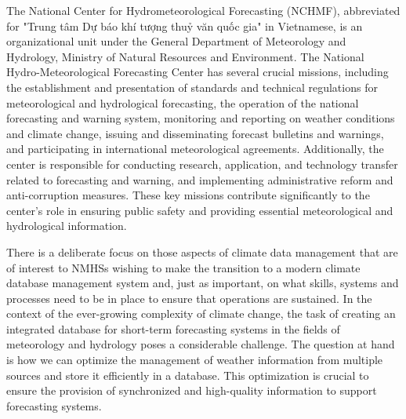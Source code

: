 

The National Center for Hydrometeorological Forecasting (NCHMF), abbreviated for "Trung tâm Dự báo khí tượng thuỷ văn quốc gia" in Vietnamese, is an organizational unit under the General Department of Meteorology and Hydrology, Ministry of Natural Resources and Environment\cite{NMHS}. The National Hydro-Meteorological Forecasting Center has several crucial missions, including the establishment and presentation of standards and technical regulations for meteorological and hydrological forecasting, the operation of the national forecasting and warning system, monitoring and reporting on weather conditions and climate change, issuing and disseminating forecast bulletins and warnings, and participating in international meteorological agreements. Additionally, the center is responsible for conducting research, application, and technology transfer related to forecasting and warning, and implementing administrative reform and anti-corruption measures. These key missions contribute significantly to the center's role in ensuring public safety and providing essential meteorological and hydrological information.

There is a deliberate focus on those aspects of climate data management that are of interest to
NMHSs wishing to make the transition to a modern climate database management system and,
just as important, on what skills, systems and processes need to be in place to ensure that
operations are sustained. In the context of the ever-growing complexity of climate change, the task of creating an integrated database for short-term forecasting systems in the fields of meteorology and hydrology poses a considerable challenge. The question at hand is how we can optimize the management of weather information from multiple sources and store it efficiently in a database. This optimization is crucial to ensure the provision of synchronized and high-quality information to support forecasting systems.
